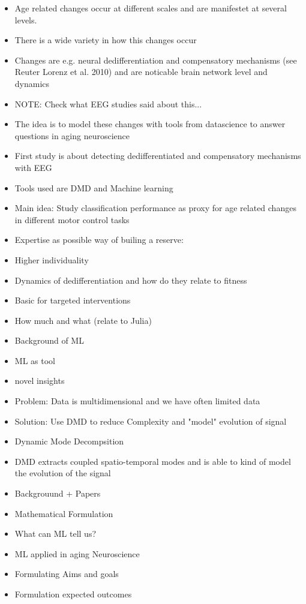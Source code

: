 \begin{itemize}
    \item Age related changes occur at different scales and are manifestet at several levels.
    \item There is a wide variety in how this changes occur
    \item Changes are e.g. neural dedifferentiation and compensatory mechanisms (see Reuter Lorenz et al. 2010) and are noticable brain network level and dynamics
    \item NOTE: Check what EEG studies said about this...
    \item The idea is to model these changes with tools from datascience to answer questions in aging neuroscience
    \item First study is about detecting dedifferentiated and compensatory mechanisms with EEG
    \item Tools used are DMD and Machine learning
    \item Main idea: Study classification performance as proxy for age related changes in different motor control tasks
    \item Expertise as possible way of builing a reserve:
    \item Higher individuality 
    \item Dynamics of dedifferentiation and how do they relate to fitness
    \item Basic for targeted interventions 
    \item How much and what (relate to Julia)
    \item Background of ML
    \item ML as tool 
    \item novel insights 
    \item Problem: Data is multidimensional and we have often limited data 
    \item Solution: Use DMD to reduce Complexity and "model" evolution of signal 
    \item Dynamic Mode Decompsition
    \item DMD extracts coupled spatio-temporal modes and is able to kind of model the evolution of the signal 
    \item Backgrouund + Papers 
    \item Mathematical Formulation
    \item What can ML tell us?
    \item ML applied in aging Neuroscience
    \item Formulating Aims and goals 
    \item Formulation expected outcomes
\end{itemize}
